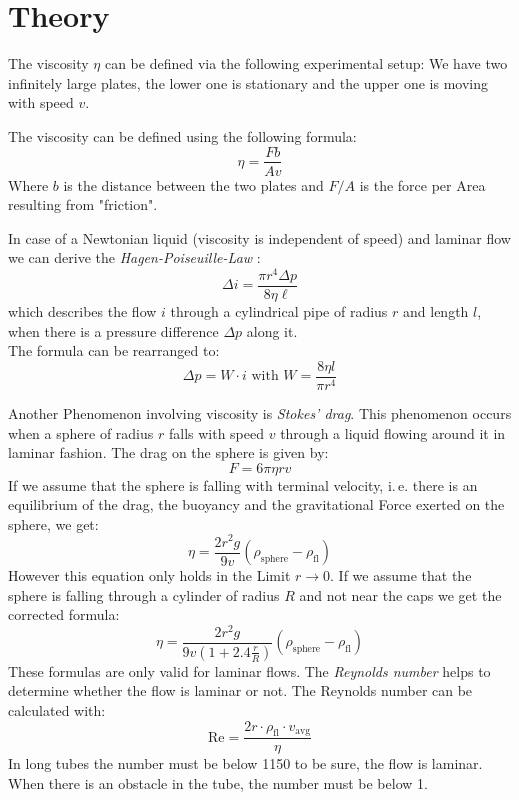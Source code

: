 \section{Theory}

The viscosity $\eta$ can be defined via the following experimental setup: We have two infinitely large plates, the lower one is stationary and the upper one is moving with speed $v$.

The viscosity can be defined using the following formula:
\begin{equation}
    \eta = \frac{F b}{A v} \label{eq:vis}
\end{equation}
Where $b$ is the distance between the two plates and $F/A$ is the force per Area resulting from "friction".

In case of a Newtonian liquid (viscosity is independent of speed) and laminar flow  we can derive the \emph{Hagen-Poiseuille-Law} :
\begin{equation}
   \Delta i = \frac{\pi r^4 \Delta p}{8 \eta \ell} \label{eq:hp}
\end{equation}
which describes the flow $i$ through a cylindrical pipe of radius $r$ and length $l$, when there is a pressure difference $\Delta p$ along it.\\
The formula can be rearranged to:
\begin{equation}
\Delta p = W \cdot i \text{ with } W = \frac{8\eta l}{\pi r^4}
\label{eq:pressure}
\end{equation}


Another Phenomenon involving viscosity is \emph{Stokes' drag}. This phenomenon occurs when a sphere of radius $r$ falls with speed $v$ through a liquid flowing around it in laminar fashion. The drag on the sphere is given by:
\begin{equation}
    F = 6 \pi \eta r v \label{eq:stokes}
\end{equation}
If we assume that the sphere is falling with terminal velocity, i.\,e. there is an equilibrium of the drag, the buoyancy and the gravitational Force exerted on the sphere, we get:
\begin{equation}
    \eta = \frac{2 r^2 g}{9 v}(\rho_\mathrm{sphere} - \rho_\mathrm{fl}) \label{eq:termid}
\end{equation}
However this equation only holds in the Limit $r \to 0$. 
If we assume that the sphere is falling through a cylinder of radius $R$ and not near the caps we get the corrected formula:
\begin{equation}
    \eta = \frac{2 r^2 g}{9 v \left( 1 + 2.4 \frac{r}{R} \right)}(\rho_\mathrm{sphere} - \rho_\mathrm{fl}) \label{eq:term}
\end{equation}
These formulas are only valid for laminar flows. The \emph{Reynolds number} helps to determine whether the flow is laminar or not. The Reynolds number can be calculated with:
\begin{equation}
\text{Re} = \frac{2r\cdot \rho_\mathrm{fl} \cdot v_\mathrm{avg}}{\eta}
\label{eq:reynold}
\end{equation}
In long tubes the number must be below 1150 to be sure, the flow is laminar. When there is an obstacle in the tube, the number must be below 1.




